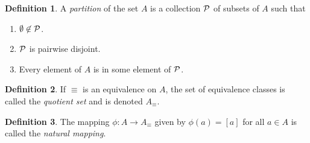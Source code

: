 \documentclass[12pt]{article}
\newcommand{\enumarabic}[1]{
	\begin{enumerate}[label=\textbf{\arabic*.}]
		#1
	\end{enumerate}
}
\theoremstyle{definition}
\newtheorem*{defn}{Definition}
\begin{document}
\begin{defn}
	A \emph{partition} of the set $A$ is a collection $\cal P$ of subsets of $A$ such that
	\enumarabic{
		\item $\emptyset\not\in\cal P$.
		\item $\cal P$ is pairwise disjoint.
		\item Every element of $A$ is in some element of $\cal P$.
	}
\end{defn}
\begin{defn}
	If $\equiv$ is an equivalence on $A$, the set of equivalence classes is called the \emph{quotient set} and is denoted $A_\equiv$.
\end{defn}
\begin{defn}
	The mapping $\phi:A\to A_{\equiv}$ given by $\phi(a)=[a]$ for all $a\in A$ is called the \emph{natural mapping}.
\end{defn}
\end{document}
